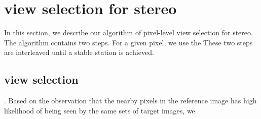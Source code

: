 \section{view selection for stereo}

In this section, we describe our algorithm of pixel-level view selection for stereo. 
The algorithm contains two steps. For a given pixel, we use the 
These two steps are interleaved until a stable station is achieved. 

\subsection{view selection}
 .
Based on the observation that the nearby pixels in the reference image has high likelihood of being seen by the same sets of target images, we 











